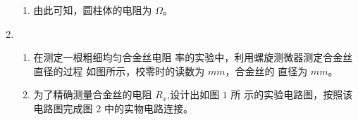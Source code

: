 \begin{enumerate}
\begin{enumerate}
\item 
由此可知，圆柱体的电阻为 \underlinegap $ \Omega $。


\end{enumerate}




\item 
{}
\begin{enumerate}
\item
在测定一根粗细均匀合金丝电阻
率的实验中，利用螺旋测微器测定合金丝直径的过程
如图所示，校零时的读数为 \underlinegap $ mm $，合金丝的
直径为 \underlinegap $ mm $。
\begin{figure}[h!]
\centering

\end{figure}

\item 
为了精确测量合金丝的电阻 $ R_{x} $,设计出如图 $ 1 $ 所
示的实验电路图，按照该电路图完成图 $ 2 $ 中的实物电路连接。
\begin{figure}[h!]
\centering
\begin{subfigure}{0.4\linewidth}
\centering
 
\caption{}\label{}
\end{subfigure}
\begin{subfigure}{0.4\linewidth}
\centering
 
\caption{}\label{}
\end{subfigure}
\end{figure}





\end{enumerate}
\end{enumerate}
